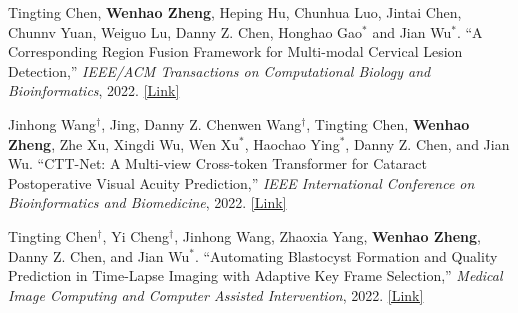 \begin{cventries}
{\begin{cvitemize2}
            \vspace{1mm}
            \item Tingting Chen, \textbf{Wenhao Zheng}, Heping Hu, Chunhua Luo, Jintai Chen, Chunnv Yuan, Weiguo Lu, Danny Z. Chen, Honghao Gao$^*$ and Jian Wu$^*$. ``A Corresponding Region Fusion Framework for Multi-modal Cervical Lesion Detection,'' \textit{IEEE/ACM Transactions on Computational Biology and Bioinformatics}, 2022. \href{https://ieeexplore.ieee.org/document/9784879}{\textcolor{link}{[Link]}}
            \vspace{1mm}
            \item Jinhong Wang$^\dagger$, Jing, Danny Z. Chenwen Wang$^\dagger$, Tingting Chen, \textbf{Wenhao Zheng}, Zhe Xu, Xingdi Wu, Wen Xu$^*$, Haochao Ying$^*$, Danny Z. Chen, and Jian Wu. ``CTT-Net: A Multi-view Cross-token Transformer for Cataract Postoperative Visual Acuity Prediction,'' \textit{IEEE International Conference on Bioinformatics and Biomedicine}, 2022. \href{https://ieeexplore.ieee.org/document/9995392}{\textcolor{link}{[Link]}}
            \vspace{1mm}
            \item Tingting Chen$^\dagger$, Yi Cheng$^\dagger$, Jinhong Wang, Zhaoxia Yang, \textbf{Wenhao Zheng}, Danny Z. Chen, and Jian Wu$^*$. ``Automating Blastocyst Formation and Quality Prediction in Time-Lapse Imaging with Adaptive Key Frame Selection,'' \textit{Medical Image Computing and Computer Assisted Intervention}, 2022. \href{https://link.springer.com/chapter/10.1007/978-3-031-16440-8_43}{\textcolor{link}{[Link]}}
        \end{cvitemize2}
    }

\end{cventries}
